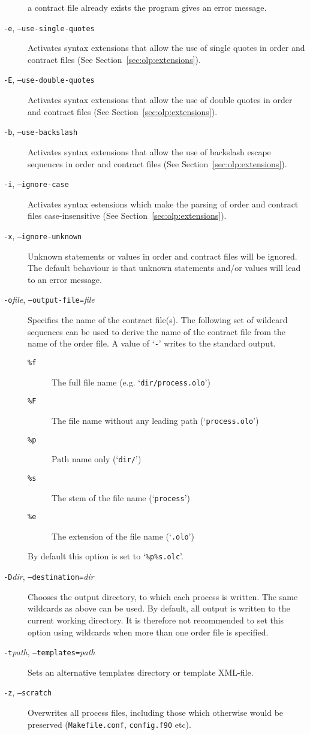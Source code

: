\documentclass[11pt,a4paper]{refrep}
\begin{document}
\begin{description}
      a contract file already exists the program gives an error message.
\item[\texttt{-e}, \texttt{--use-single-quotes}]
      Activates syntax extensions that allow the use of single quotes in
      order and contract files (See Section~\ref{sec:olp:extensions}).
\item[\texttt{-E}, \texttt{--use-double-quotes}]
      Activates syntax extensions that allow the use of double quotes in
      order and contract files (See Section~\ref{sec:olp:extensions}).
\item[\texttt{-b}, \texttt{--use-backslash}]
      Activates syntax extensions that allow the use of backslash escape
      sequences in
      order and contract files (See Section~\ref{sec:olp:extensions}).
\item[\texttt{-i}, \texttt{--ignore-case}] 
      Activates syntax estensions which make the parsing of order
      and contract files case-insensitive
      (See Section~\ref{sec:olp:extensions}).
\item[\texttt{-x}, \texttt{--ignore-unknown}]
      Unknown statements or values in order and contract files will be ignored.
      The default behaviour is that unknown statements and/or values will lead
      to an error message.
\item[\texttt{-o}\textit{file}, \texttt{--output-file=}\textit{file}]
      Specifies the name of the contract file(s). The following set of
      wildcard sequences can be used to derive the name of the contract file
      from the name of the order file. A value of
      `\texttt{-}' writes to the standard output.
      \begin{description}
      \item[\texttt{\%f}] The full file name (e.g. `\texttt{dir/process.olo}')
      \item[\texttt{\%F}] The file name without any leading path
         (`\texttt{process.olo}')
      \item[\texttt{\%p}] Path name only (`\texttt{dir/}')
      \item[\texttt{\%s}] The stem of the file name (`\texttt{process}')
      \item[\texttt{\%e}] The extension of the file name (`\texttt{.olo}')
      \end{description}
      By default this option is set to `\texttt{\%p\%s.olc}'.
\item[\texttt{-D}\textit{dir}, \texttt{--destination=}\textit{dir}]
      Chooses the output directory, to which each process is written.
      The same wildcards as above can be used. By default, all output is
      written to the current working directory. It is therefore not recommended
      to set this option using wildcards when more than one order file is
      specified.
\item[\texttt{-t}\textit{path}, \texttt{--templates=}\textit{path}]
      Sets an alternative templates directory or template
      XML-file.
\item[\texttt{-z}, \texttt{--scratch}]
      Overwrites all process files, including those which otherwise
      would be preserved (\texttt{Makefile.conf}, \texttt{config.f90} etc).
\end{description}
\end{document}
